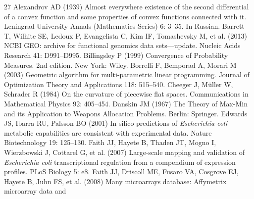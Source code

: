 \begin{thebibliography}{27}
\setlength{\itemsep}{2pt}
\small
{}
Alexandrov AD (1939) Almost everywhere existence of the second differential of a
             convex function and some properties of convex functions
             connected with it. Leningrad University Annals (Mathematics Series) 6: 3--35. In Russian.
Barrett T, Wilhite SE, Ledoux P, Evangelista C, Kim IF, Tomashevsky M, et al. (2013) {NCBI GEO}: archive for functional genomics data sets---update. Nucleic Acids Research 41: D991--D995.
Billingsley P (1999) Convergence of Probability Measures. 2nd edition. New York: Wiley.
Borrelli F, Bemporad A, Morari M (2003) Geometric algorithm for multi-parametric linear
             programming. Journal of Optimization Theory and Applications 118: 515--540.
Cheeger J, M{\"u}ller W, Schrader R (1984) On the curvature of piecewise flat spaces. Communications in Mathematical Physics 92: 405--454.
Danskin JM (1967) The Theory of Max-Min and its Application to Weapons
               Allocation Problems. Berlin: Springer.
Edwards JS, Ibarra RU, Palsson BO (2001) In silico predictions of \emph{Escherichia coli} metabolic
             capabilities are consistent with experimental data. Nature Biotechnology 19: 125--130.
Faith JJ, Hayete B, Thaden JT, Mogno I, Wierzbowski J, Cottarel G, et al. (2007) Large-scale mapping and validation of \emph{Escherichia coli}
             transcriptional regulation from a compendium of expression
             profiles. PLoS Biology 5: e8.
Faith JJ, Driscoll ME, Fusaro VA, Cosgrove EJ, Hayete B, Juhn FS, et al. (2008) Many microarrays database: Affymetrix microarray data and

\end{thebibliography}

